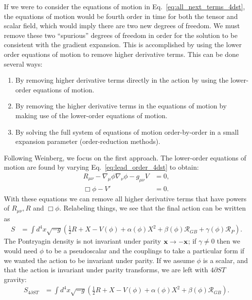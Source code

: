 \documentclass{ws-ijmpd}
\begin{document}
If we were to consider the equations of motion in
Eq.~\eqref{eq:all_next_terms_4dst}, the equations of motion would
be fourth order in time for both the tensor and scalar field, 
which would imply there are two new degrees of freedom.
We must remove these two ``spurious'' degrees of freedom 
in order for the solution to be consistent with the gradient expansion.
This is accomplished by using the lower order equations of motion
to remove higher derivative terms. This can be done several ways:
\begin{enumerate}
   \item By removing higher derivative terms directly in the action by
using the lower-order equations of motion.
   \item By removing the higher derivative terms in the equations of motion
      by making use of the lower-order equations of motion.
   \item By solving the full system of equations of motion order-by-order
      in a small expansion parameter (order-reduction methods).
\end{enumerate}
Following Weinberg, we focus on the first approach.
The lower-order equations of motion are found by varying
Eq.~\eqref{eq:lead_order_4dst} to obtain:
\begin{align}
   R_{\mu\nu}
   -
   \nabla_{\mu}\phi\nabla_{\nu}\phi
   -
   g_{\mu\nu}V
   &=
   0
   ,\\
   \Box\phi - V'
   &=
   0
   .
\end{align}
With these equations we can remove all higher derivative
terms that have powers of $R_{\mu\nu},R$ and $\Box\phi$.
Relabeling things, we see that the final action can be written as
\begin{align}
   S
   &=
   \int d^4x\sqrt{-g}\left(
      \frac{1}{2}R
      +
      X
      -
      V\left(\phi\right)
      +
      \alpha\left(\phi\right)X^2
      +
      \beta\left(\phi\right)\mathcal{R}_{GB}
      +
      \gamma\left(\phi\right)\mathcal{R}_{P}
   \right)
   .
\end{align}
The Pontryagin density is not invariant under parity ${\bf x}\to-{\bf x}$;
if $\gamma\neq0$ then we would need $\phi$ to be a pseudoscalar and the
couplings to take a particular form if we wanted the action to be
invariant under parity\cite{Alexander:2009tp}.
If we assume $\phi$ is a scalar, and that the action is invariant under
parity transforms, we are left with $4\partial ST$ gravity:
\begin{align}
   S_{4\partial ST}
   &=
   \int d^4x\sqrt{-g}\left(
      \frac{1}{2}R
      +
      X
      -
      V\left(\phi\right)
      +
      \alpha\left(\phi\right)X^2
      +
      \beta\left(\phi\right)\mathcal{R}_{GB}
   \right)
   .
\end{align}
\end{document}
